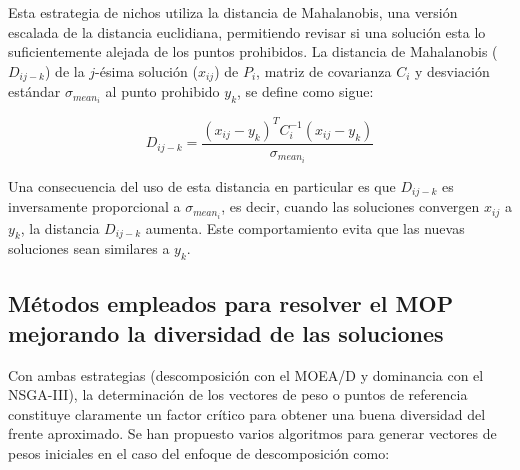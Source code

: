 \documentclass[letterpaper,10pt]{article}
\begin{document}
Esta estrategia de nichos utiliza la distancia de Mahalanobis\cite{mahalanobis1936generalised}, una versión escalada de la distancia euclidiana, permitiendo revisar si una solución esta lo suficientemente
alejada de los puntos prohibidos. La distancia de Mahalanobis ($D_{ij-k}$) de la $j$-ésima solución ($x_{ij}$) de $P_i$, matriz de covarianza $C_i$ y desviación estándar $\sigma_{mean_i}$ al punto prohibido
$y_k$, se define como sigue:

$$D_{ij-k} = \frac{(x_{ij}-y_k)^T C^{-1}_i (x_{ij}-y_k)}{\sigma_{mean_i}}$$

Una consecuencia del uso de esta distancia en particular es que $D_{ij-k}$ es inversamente proporcional a $\sigma_{mean_i}$, es decir, cuando las soluciones convergen $x_{ij}$ a $y_k$, 
la distancia $D_{ij-k}$ aumenta. Este comportamiento evita que las nuevas soluciones sean similares a $y_k$.


\subsection{Métodos empleados para resolver el MOP mejorando la diversidad de las soluciones}

Con ambas estrategias (descomposición con el MOEA/D y dominancia con el NSGA-III), la determinación de los vectores de peso o puntos de referencia constituye claramente un factor crítico para obtener una buena diversidad del frente aproximado. Se han propuesto varios algoritmos para generar vectores de pesos iniciales en el caso del enfoque de descomposición como:
\newline
\end{document}
